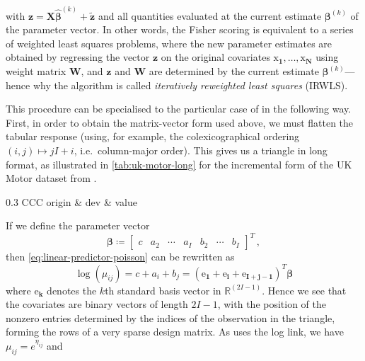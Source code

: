 \documentclass[a4paper]{book}
\begin{document}
with $\mathbf{z} = \mathbf{X} \bm{\widehat{\beta}}^{(k)} + \mathbf{\tilde{z}}$ and all quantities evaluated at the current estimate $\bm{\beta}^{(k)}$ of the parameter vector. In other words, the Fisher scoring is equivalent to a series of weighted least squares problems, where the new parameter estimates are obtained by regressing the vector $\mathbf{z}$ on the original covariates $\bm{\mathrm{x}_1}, \dots, \bm{\mathrm{x}_N}$ using weight matrix $\mathbf{W}$, and $\mathbf{z}$ and $\mathbf{W}$ are determined by the current estimate $\bm{\beta}^{(k)}$---hence why the algorithm is called \emph{iteratively reweighted least squares} (IRWLS).

This procedure can be specialised to the particular case of  in the following way. First, in order to obtain the matrix-vector form used above, we must flatten the tabular response (using, for example, the colexicographical ordering $(i, j) \mapsto j I + i$, i.e.\ column-major order). This gives us a triangle in long format, as illustrated in \cref{tab:uk-motor-long} for the incremental form of the UK Motor dataset from \textcite{christofides}.
\begin{table}[!htb]
  \centering
  \begin{tabularx}{0.3 \linewidth}{CCC}\toprule%
    origin  & dev  & value  \\ \midrule
    \bottomrule%
  \end{tabularx}
  \caption{UK Motor incremental claims triangle in long format}
  \label{tab:uk-motor-long}
\end{table}
If we define the parameter vector
\begin{equation}
  \bm{\beta} \coloneqq \begin{bmatrix} c & a_2 & \cdots & a_I & b_2 & \cdots & b_I \end{bmatrix}^T \,,
\end{equation}
then \cref{eq:linear-predictor-poisson} can be rewritten as
\begin{equation} \label{eq:poisson-covariates}
  \log(\mu_{ij}) = c + a_i + b_j = (\bm{\mathrm{e}_1} + \bm{\mathrm{e}_i} + \bm{\mathrm{e}_{I + j - 1}})^T \bm{\beta}
\end{equation}
where $\bm{\mathrm{e}_k}$ denotes the $k$th standard basis vector in $\mathbb{R}^{(2I - 1)}$. Hence we see that the covariates are binary vectors of length $2I - 1$, with the position of the nonzero entries determined by the indices of the observation in the triangle, forming the rows of a very sparse design matrix. As  uses the log link, we have $\mu_{ij} = e^{\eta_{ij}}$ and
\end{document}
